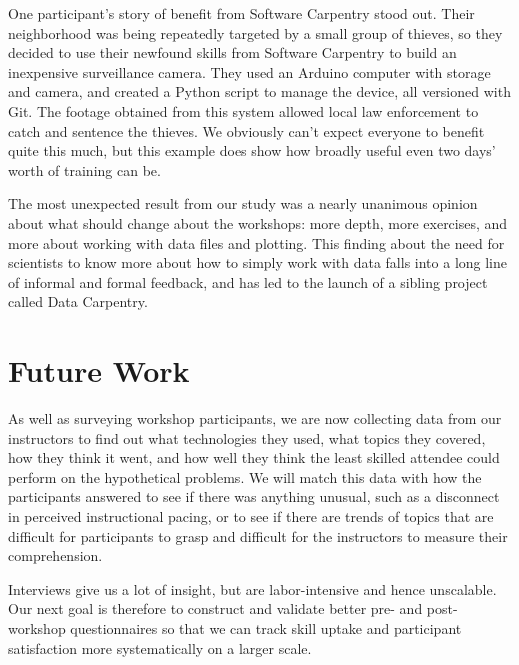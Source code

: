 \documentclass[10pt, twocolumn]{article}
\begin{document}
One participant's story of benefit from Software Carpentry stood out.
Their neighborhood was being repeatedly targeted by a small group of thieves,
so they decided to use their newfound skills from Software Carpentry to build an inexpensive surveillance camera.
They used an Arduino computer with storage and camera,
and created a Python script to manage the device,
all versioned with Git.
The footage obtained from this system allowed local law enforcement to catch and sentence the thieves.
We obviously can't expect everyone to benefit quite this much,
but this example does show how broadly useful even two days' worth of training can be.

The most unexpected result from our study was a nearly unanimous opinion about what should change about the workshops:
more depth,
more exercises,
and more about working with data files and plotting.
This finding about the need for scientists to know more about how to simply work with data
falls into a long line of informal and formal feedback,
and has led to the launch of a sibling project called Data Carpentry.

\section{Future Work}

As well as surveying workshop participants,
we are now collecting data from our instructors
to find out what technologies they used,
what topics they covered,
how they think it went,
and how well they think the least skilled attendee could perform on the hypothetical problems.
We will match this data with how the participants answered to see if there was anything unusual,
such as a disconnect in perceived instructional pacing,
or to see if there are trends of topics that are difficult for participants to grasp
and difficult for the instructors to measure their comprehension.

Interviews give us a lot of insight,
but are labor-intensive and hence unscalable.
Our next goal is therefore to construct and validate better pre- and post-workshop questionnaires
so that we can track skill uptake and participant satisfaction
more systematically on a larger scale.

{\small
	
	
}
\end{document}
